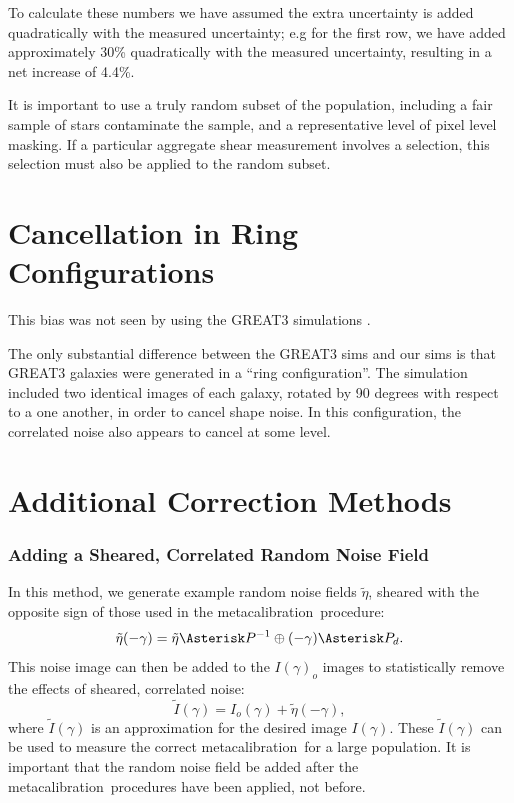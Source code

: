 \documentclass[usegraphicx,usenatbib]{mn2e}
\newcommand{\mcal}{metacalibration}
\begin{document}
To calculate these numbers we have assumed the extra uncertainty is added
quadratically with the measured uncertainty; e.g for the first row, we have
added approximately 30\% quadratically with the measured uncertainty, resulting
in a net increase of 4.4\%.

It is important to use a truly random subset of the population, including a
fair sample of stars contaminate the sample, and a representative level of
pixel level masking.  If a particular aggregate shear measurement involves a
selection, this selection must also be applied to the random subset.

\section{Cancellation in Ring Configurations}

This bias was not seen by \cite{HuffMcal} using the GREAT3 simulations
\citep{great3}.

The only substantial difference between the GREAT3 sims and our sims is that
GREAT3 galaxies were generated in a ``ring configuration''.  The simulation
included two identical images of each galaxy, rotated by 90 degrees with
respect to a one another, in order to cancel shape noise.  In this configuration,
the correlated noise also appears to cancel at some level.

\appendix

\section{Additional Correction Methods}

\subsubsection{Adding a Sheared, Correlated Random Noise Field}

In this method, we generate example random noise fields $\tilde{\eta}$, sheared
with the opposite sign of those used in the \mcal\ procedure:
\begin{equation}
    \tilde{\eta}(-\gamma) = \tilde{\eta} \Asterisk P^{-1} \oplus (-\gamma) \Asterisk P_{d}.
\end{equation}
This noise image can then be added to the $I(\gamma)_o$ images to
statistically remove the effects of sheared, correlated noise:
\begin{equation}
    \tilde{I}(\gamma) = I_o(\gamma) + \tilde{\eta}(-\gamma),
\end{equation}
where $\tilde{I}(\gamma)$ is an approximation for the desired image
$I(\gamma)$.    These $\tilde{I}(\gamma)$
can be used to measure the correct \mcal\ for a large population.
It is important that the random noise field be added after
the \mcal\ procedures have been applied, not before.
\end{document}
